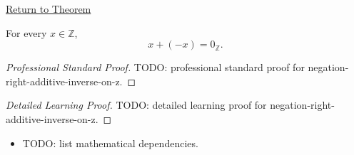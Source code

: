 \newpage
{}
\label{prf:negation-right-additive-inverse-on-z}

\begin{remark*}[Return]
\hyperref[cor:negation-right-additive-inverse-on-z]{Return to Theorem}
\end{remark*}

\begin{corollary*}
For every $x\in\mathbb{Z}$,
\[
x+(-x)=0_{\mathbb{Z}}.
\]
\end{corollary*}

\begin{proof}[Professional Standard Proof]
\LRAProofBodyStart
TODO: professional standard proof for negation-right-additive-inverse-on-z.
\end{proof}

\begin{proof}[Detailed Learning Proof]
\LRAProofBodyStart
TODO: detailed learning proof for negation-right-additive-inverse-on-z.
\end{proof}

\begin{remark*}
\end{remark*}

\begin{dependencies}
\begin{itemize}
  \item TODO: list mathematical dependencies.
\end{itemize}
\end{dependencies}

\clearpage
